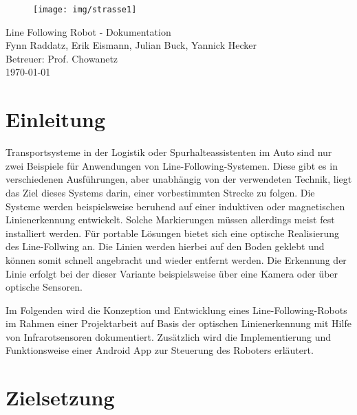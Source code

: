 \documentclass[12pt, a4paper]{report}
\begin{document}
    \begin{figure}
        \centering
        \texttt{[image: img/strasse1]}
    \end{figure}
    
   \vspace*{1.2cm}
   \begin{center}
       {\huge Line Following Robot - Dokumentation}\\[0.8cm]
       \large{Fynn Raddatz, Erik Eismann, Julian Buck, Yannick Hecker}\\[0.5cm]
       \large{Betreuer: Prof. Chowanetz}\\[0.5cm]
       \today
       \thispagestyle{empty}
   \end{center}
   \newpage
   \tableofcontents
   \clearpage
   \pagestyle{fancy}

\chapter{Einleitung}

Transportsysteme in der Logistik oder Spurhalteassistenten im Auto sind nur zwei Beispiele für Anwendungen von Line-Following-Systemen. Diese gibt es in verschiedenen Ausführungen, aber unabhängig von der verwendeten Technik, liegt das Ziel dieses Systems darin, einer vorbestimmten Strecke zu folgen. Die Systeme werden beispielsweise beruhend auf einer induktiven oder magnetischen Linienerkennung entwickelt. Solche Markierungen müssen allerdings meist fest installiert werden. Für portable Lösungen bietet sich eine optische Realisierung des Line-Follwing an. Die Linien werden hierbei auf den Boden geklebt und können somit schnell angebracht und wieder entfernt werden. Die Erkennung der Linie erfolgt bei der dieser Variante beispielsweise über eine Kamera oder über optische Sensoren.

Im Folgenden wird die Konzeption und Entwicklung eines Line-Following-Robots im Rahmen einer Projektarbeit auf Basis der optischen Linienerkennung mit Hilfe von Infrarotsensoren dokumentiert. Zusätzlich wird die Implementierung und Funktionsweise einer Android App zur Steuerung des Roboters erläutert.\cite{schilling, schaefer, bosch} 


\chapter{Zielsetzung}\label{sec:Zielsetzung}
\end{document}
